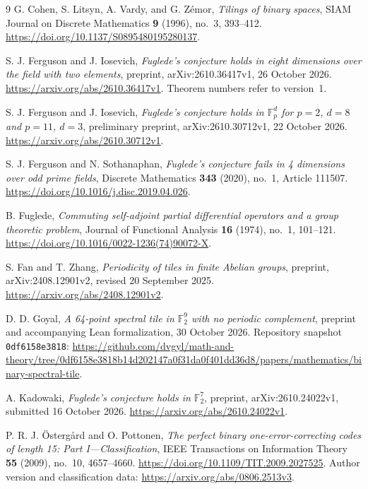 \documentclass[11pt]{article}
\numberwithin{equation}{section}
\theoremstyle{definition}
\theoremstyle{remark}\newtheorem{remark}[theorem]{Remark}
\begin{document}
\clearpage
\begin{thebibliography}{9}
G. Cohen, S. Litsyn, A. Vardy, and G. Z\'emor,
\emph{Tilings of binary spaces}, SIAM Journal on Discrete Mathematics
\textbf{9} (1996), no.~3, 393--412.
\url{https://doi.org/10.1137/S0895480195280137}.

S. J. Ferguson and J. Iosevich,
\emph{Fuglede's conjecture holds in eight dimensions over the field with
two elements}, preprint, arXiv:2610.36417v1, 26 October 2026.
\url{https://arxiv.org/abs/2610.36417v1}.
Theorem numbers refer to version~1.

S. J. Ferguson and J. Iosevich,
\emph{Fuglede's conjecture holds in $\mathbb F_p^d$ for $p=2$, $d=8$ and
$p=11$, $d=3$}, preliminary preprint, arXiv:2610.30712v1,
22 October 2026.
\url{https://arxiv.org/abs/2610.30712v1}.

S. J. Ferguson and N. Sothanaphan,
\emph{Fuglede's conjecture fails in 4 dimensions over odd prime fields},
Discrete Mathematics \textbf{343} (2020), no.~1, Article 111507.
\url{https://doi.org/10.1016/j.disc.2019.04.026}.

B. Fuglede, \emph{Commuting self-adjoint partial differential operators
and a group theoretic problem}, Journal of Functional Analysis
\textbf{16} (1974), no.~1, 101--121.
\url{https://doi.org/10.1016/0022-1236(74)90072-X}.

S. Fan and T. Zhang,
\emph{Periodicity of tiles in finite Abelian groups},
preprint, arXiv:2408.12901v2, revised 20 September 2025.
\url{https://arxiv.org/abs/2408.12901v2}.

D. D. Goyal,
\emph{A 64-point spectral tile in $\mathbb F_2^9$ with no periodic complement},
preprint and accompanying Lean formalization, 30 October 2026.
Repository snapshot \texttt{0df6158e3818}:
\url{https://github.com/dvgyl/math-and-theory/tree/0df6158e3818b14d202147a0f31da0f401dd36d8/papers/mathematics/binary-spectral-tile}.

A. Kadowaki, \emph{Fuglede's conjecture holds in $\mathbb F_2^7$},
preprint, arXiv:2610.24022v1, submitted 16 October 2026.
\url{https://arxiv.org/abs/2610.24022v1}.

P. R. J. \"Osterg\aa rd and O. Pottonen,
\emph{The perfect binary one-error-correcting codes of length 15:
Part I---Classification}, IEEE Transactions on Information Theory
\textbf{55} (2009), no.~10, 4657--4660.
\url{https://doi.org/10.1109/TIT.2009.2027525}.
Author version and classification data:
\url{https://arxiv.org/abs/0806.2513v3}.
\end{thebibliography}
\end{document}
